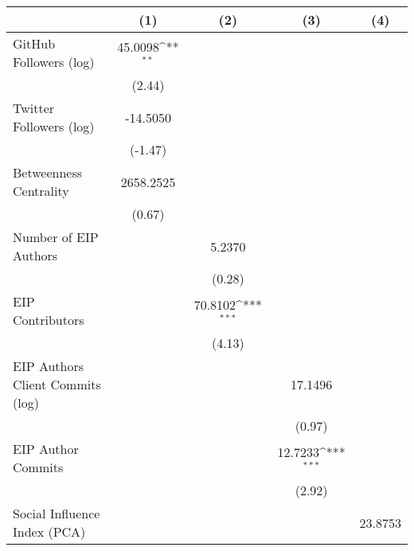 {
\def\sym#1{\ifmmode^{#1}\else\(^{#1}\)\fi}
\begin{tabular}{l*{4}{c}}
\hline\hline
                                   &\multicolumn{1}{c}{(1)}         &\multicolumn{1}{c}{(2)}         &\multicolumn{1}{c}{(3)}         &\multicolumn{1}{c}{(4)}         \\
\hline
GitHub Followers (log)             &   45.0098\sym{**} &                   &                   &                   \\
                                   &    (2.44)         &                   &                   &                   \\
[1em]
Twitter Followers (log)            &  -14.5050         &                   &                   &                   \\
                                   &   (-1.47)         &                   &                   &                   \\
[1em]
Betweenness Centrality             & 2658.2525         &                   &                   &                   \\
                                   &    (0.67)         &                   &                   &                   \\
[1em]
Number of EIP Authors              &                   &    5.2370         &                   &                   \\
                                   &                   &    (0.28)         &                   &                   \\
[1em]
EIP Contributors                   &                   &   70.8102\sym{***}&                   &                   \\
                                   &                   &    (4.13)         &                   &                   \\
[1em]
EIP Authors Client Commits (log)   &                   &                   &   17.1496         &                   \\
                                   &                   &                   &    (0.97)         &                   \\
[1em]
EIP Author Commits                 &                   &                   &   12.7233\sym{***}&                   \\
                                   &                   &                   &    (2.92)         &                   \\
[1em]
Social Influence Index (PCA)       &                   &                   &                   &   23.8753         \\

\end{tabular}}
